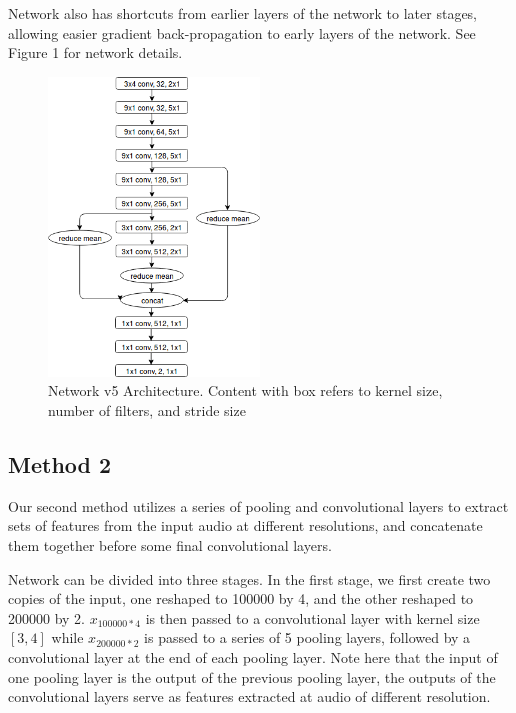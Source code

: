 \documentclass[10pt,twocolumn,letterpaper]{article}
\begin{document}
Network also has shortcuts from earlier layers of the network to later
stages, allowing easier gradient back-propagation to early layers of the
network. See Figure 1 for network details.

\begin{figure}[t]
	\centering
	\includegraphics[width=0.5\textwidth]{v5_diagram}
	\caption{Network v5 Architecture. Content with box refers to kernel size,
	number of filters, and stride size}
\end{figure}


\subsection{Method 2}

Our second method utilizes a series of pooling and convolutional layers to
extract sets of features from the input audio at different resolutions, and
concatenate them together before some final convolutional layers.

Network can be divided into three stages. In the first stage, we first
create two copies of the input, one reshaped to 100000 by 4, and the other
reshaped to 200000 by 2. \(x_{100000*4}\) is then passed to a convolutional
layer with kernel size \([3,4]\) while \(x_{200000*2}\) is passed to a
series of 5 pooling layers, followed by a convolutional layer at the end of
each pooling layer. Note here that the input of one pooling layer is the
output of the previous pooling layer, the outputs of the convolutional
layers serve as features extracted at audio of different resolution.
\end{document}
